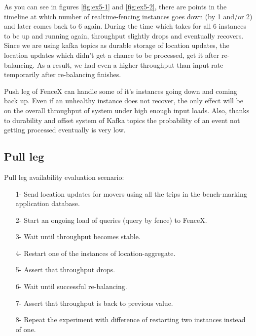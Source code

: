 \documentclass[a4]{report}
\begin{document}
    As you can see in figures \ref{fig:ex5-1} and \ref{fig:ex5-2}, there are points in the timeline at which number of
    realtime-fencing instances goes down (by 1 and/or 2) and later comes back to 6 again.
    During the time which takes for all 6 instances to be up and running again, throughput slightly drops and
    eventually recovers.
    Since we are using kafka topics as durable storage of location updates, the location updates which
    didn't get a chance to be processed, get it after re-balancing.
    As a result, we had even a higher throughput than input rate temporarily after re-balancing finishes.

    Push leg of FenceX can handle some of it's instances going down and coming back up.
    Even if an unhealthy instance does not recover, the only effect will be on the overall throughput of system under
    high enough input loads.
    Also, thanks to durability and offset system of Kafka topics the probability of an event not getting processed
    eventually is very low.


    \subsection{Pull leg}
    Pull leg availability evaluation scenario:
    \begin{itemize}
        \item[1-] Send location updates for movers using all the trips in the bench-marking application database.
        \item[2-] Start an ongoing load of queries (query by fence) to FenceX.
        \item[3-] Wait until throughput becomes stable.
        \item[4-] Restart one of the instances of location-aggregate.
        \item[5-] Assert that throughput drops.
        \item[6-] Wait until successful re-balancing.
        \item[7-] Assert that throughput is back to previous value.
        \item[8-] Repeat the experiment with difference of restarting two instances instead of one.
    \end{itemize}

    \clearpage
\end{document}
